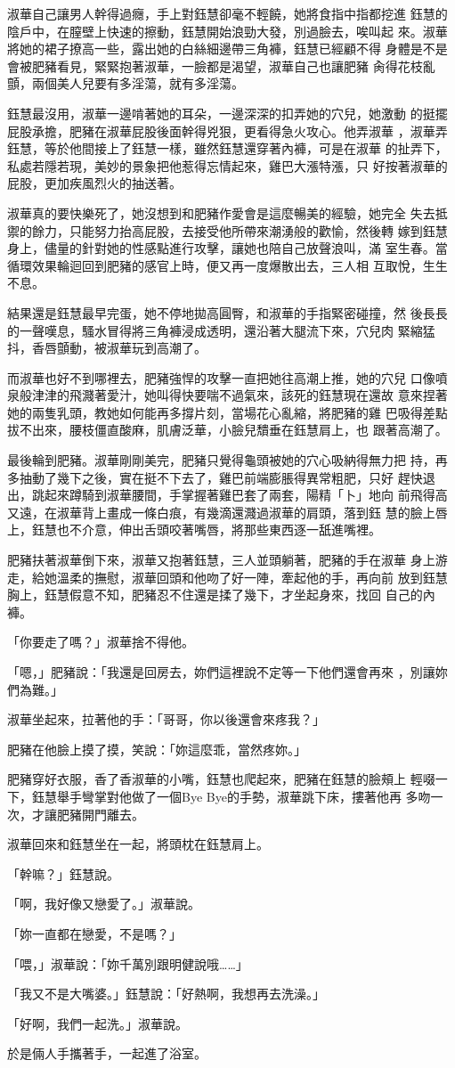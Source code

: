 淑華自己讓男人幹得過癮，手上對鈺慧卻毫不輕饒，她將食指中指都挖進
鈺慧的陰戶中，在膣壁上快速的擦動，鈺慧開始浪勁大發，別過臉去，唉叫起
來。淑華將她的裙子撩高一些，露出她的白絲細邊帶三角褲，鈺慧已經顧不得
身體是不是會被肥豬看見，緊緊抱著淑華，一臉都是渴望，淑華自己也讓肥豬
肏得花枝亂顫，兩個美人兒要有多淫蕩，就有多淫蕩。

鈺慧最沒用，淑華一邊啃著她的耳朵，一邊深深的扣弄她的穴兒，她激動
的挺擺屁股承擔，肥豬在淑華屁股後面幹得兇狠，更看得急火攻心。他弄淑華
，淑華弄鈺慧，等於他間接上了鈺慧一樣，雖然鈺慧還穿著內褲，可是在淑華
的扯弄下，私處若隱若現，美妙的景象把他惹得忘情起來，雞巴大漲特漲，只
好按著淑華的屁股，更加疾風烈火的抽送著。

淑華真的要快樂死了，她沒想到和肥豬作愛會是這麼暢美的經驗，她完全
失去抵禦的餘力，只能努力抬高屁股，去接受他所帶來潮湧般的歡愉，然後轉
嫁到鈺慧身上，儘量的針對她的性感點進行攻擊，讓她也陪自己放聲浪叫，滿
室生春。當循環效果輪迴回到肥豬的感官上時，便又再一度爆散出去，三人相
互取悅，生生不息。

結果還是鈺慧最早完蛋，她不停地拋高圓臀，和淑華的手指緊密碰撞，然
後長長的一聲嘆息，騷水冒得將三角褲浸成透明，還沿著大腿流下來，穴兒肉
緊縮猛抖，香唇顫動，被淑華玩到高潮了。

而淑華也好不到哪裡去，肥豬強悍的攻擊一直把她往高潮上推，她的穴兒
口像噴泉般津津的飛濺著愛汁，她叫得快要喘不過氣來，該死的鈺慧現在還故
意來捏著她的兩隻乳頭，教她如何能再多撐片刻，當場花心亂縮，將肥豬的雞
巴吸得差點拔不出來，腰枝僵直酸麻，肌膚泛華，小臉兒穨垂在鈺慧肩上，也
跟著高潮了。

最後輪到肥豬。淑華剛剛美完，肥豬只覺得龜頭被她的穴心吸納得無力把
持，再多抽動了幾下之後，實在挺不下去了，雞巴前端膨脹得異常粗肥，只好
趕快退出，跳起來蹲騎到淑華腰間，手掌握著雞巴套了兩套，陽精「卜」地向
前飛得高又遠，在淑華背上畫成一條白痕，有幾滴還濺過淑華的肩頭，落到鈺
慧的臉上唇上，鈺慧也不介意，伸出舌頭咬著嘴唇，將那些東西逐一舐進嘴裡。

肥豬扶著淑華倒下來，淑華又抱著鈺慧，三人並頭躺著，肥豬的手在淑華
身上游走，給她溫柔的撫慰，淑華回頭和他吻了好一陣，牽起他的手，再向前
放到鈺慧胸上，鈺慧假意不知，肥豬忍不住還是揉了幾下，才坐起身來，找回
自己的內褲。

「你要走了嗎？」淑華捨不得他。

「嗯，」肥豬說：「我還是回房去，妳們這裡說不定等一下他們還會再來
，別讓妳們為難。」

淑華坐起來，拉著他的手：「哥哥，你以後還會來疼我？」

肥豬在他臉上摸了摸，笑說：「妳這麼乖，當然疼妳。」

肥豬穿好衣服，香了香淑華的小嘴，鈺慧也爬起來，肥豬在鈺慧的臉頰上
輕啜一下，鈺慧舉手彎掌對他做了一個Bye Bye的手勢，淑華跳下床，摟著他再
多吻一次，才讓肥豬開門離去。

淑華回來和鈺慧坐在一起，將頭枕在鈺慧肩上。

「幹嘛？」鈺慧說。

「啊，我好像又戀愛了。」淑華說。

「妳一直都在戀愛，不是嗎？」

「喂，」淑華說：「妳千萬別跟明健說哦……」

「我又不是大嘴婆。」鈺慧說：「好熱啊，我想再去洗澡。」

「好啊，我們一起洗。」淑華說。

於是倆人手攜著手，一起進了浴室。










